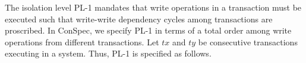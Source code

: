 \documentclass[acmlarge, ,11pt]{acmart}
\begin{document}
 \par %
  \par The isolation level PL-1 mandates that write operations in  a transaction must be executed such that write-write
 dependency cycles among transactions are proscribed. In ConSpec, we specify PL-1 in terms of a total order among write operations from different transactions. Let $\mathit{tx}$ and $\mathit{ty}$  be consecutive transactions executing in a system.  Thus, PL-1 is specified as follows. 
\end{document}
